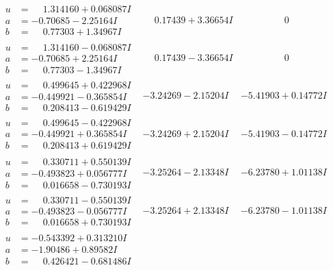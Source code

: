 \documentclass[1p]{elsarticle_modified}
\theoremstyle{definition}
\begin{document}
$$\begin{array}{c|c|c}
\begin{aligned}
u &= \phantom{-}1.314160 + 0.068087 I \\
a &= -0.70685 - 2.25164 I \\
b &= \phantom{-}0.77303 + 1.34967 I\end{aligned}
 & \phantom{-}0.17439 + 3.36654 I & \phantom{-0.000000 } 0 \\ \hline\begin{aligned}
u &= \phantom{-}1.314160 - 0.068087 I \\
a &= -0.70685 + 2.25164 I \\
b &= \phantom{-}0.77303 - 1.34967 I\end{aligned}
 & \phantom{-}0.17439 - 3.36654 I & \phantom{-0.000000 } 0 \\ \hline\begin{aligned}
u &= \phantom{-}0.499645 + 0.422968 I \\
a &= -0.449921 - 0.365854 I \\
b &= \phantom{-}0.208413 - 0.619429 I\end{aligned}
 & -3.24269 - 2.15204 I & -5.41903 + 0.14772 I \\ \hline\begin{aligned}
u &= \phantom{-}0.499645 - 0.422968 I \\
a &= -0.449921 + 0.365854 I \\
b &= \phantom{-}0.208413 + 0.619429 I\end{aligned}
 & -3.24269 + 2.15204 I & -5.41903 - 0.14772 I \\ \hline\begin{aligned}
u &= \phantom{-}0.330711 + 0.550139 I \\
a &= -0.493823 + 0.056777 I \\
b &= \phantom{-}0.016658 - 0.730193 I\end{aligned}
 & -3.25264 - 2.13348 I & -6.23780 + 1.01138 I \\ \hline\begin{aligned}
u &= \phantom{-}0.330711 - 0.550139 I \\
a &= -0.493823 - 0.056777 I \\
b &= \phantom{-}0.016658 + 0.730193 I\end{aligned}
 & -3.25264 + 2.13348 I & -6.23780 - 1.01138 I \\ \hline\begin{aligned}
u &= -0.543392 + 0.313210 I \\
a &= -1.90486 + 0.89582 I \\
b &= \phantom{-}0.426421 - 0.681486 I\end{aligned}

\end{array}$$
\end{document}
